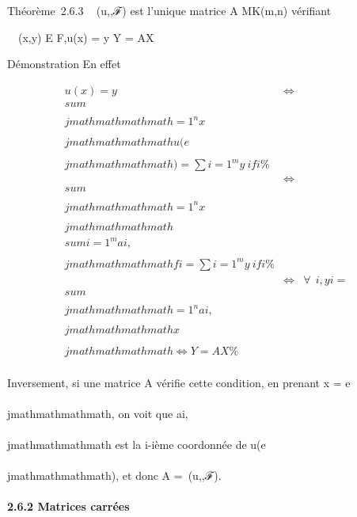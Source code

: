 Théorème~2.6.3 \mathrmMat~
(u,,ℱ) est l'unique matrice A \in MK(m,n) vérifiant

\forall~~(x,y) \in E \times F,\quad u(x) = y
\Leftrightarrow Y = AX

Démonstration En effet

\begin{align*} u(x) = y&
\Leftrightarrow & \\sum
\\\\jmathmathmathmath=1^nx \\\\jmathmathmathmathu(e\\\\jmathmathmathmath) =
\sum i=1^my~
ifi \%& \\ &
\Leftrightarrow & \\sum
\\\\jmathmathmathmath=1^nx \\\\jmathmathmathmath \\sum
i=1^ma i,\\\\jmathmathmathmathfi =
\sum i=1^my~
ifi\%& \\ &
\Leftrightarrow & \forall~~i,
yi = \\sum
\\\\jmathmathmathmath=1^na i,\\\\jmathmathmathmathx\\\\jmathmathmathmath
\Leftrightarrow Y = AX \%&
\\ \end{align*}

Inversement, si une matrice A vérifie cette condition, en prenant x =
e\\\\jmathmathmathmath, on voit que ai,\\\\jmathmathmathmath est la i-ième coordonnée de
u(e\\\\jmathmathmathmath), et donc A =\
\mathrmMat (u,,ℱ).

\paragraph{2.6.2 Matrices carrées}

